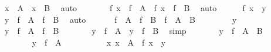\begin{isabellebody}
\begin{exercise}[subtitle=Svojstva funkcija]
\ {\isachardoublequoteopen}x\ {\isasymin}\ A\ {\isasymor}\ x\ {\isasymin}\ B{\isachardoublequoteclose}\ \isamarkupfalse%
\ auto\isanewline
\ \ \ \ \isamarkupfalse%
\ \isamarkupfalse%
\ {\isachardoublequoteopen}f\ x\ {\isasymin}\ f\ {\isacharbackquote}{\kern0pt}\ A\ {\isasymor}\ f\ x\ {\isasymin}\ f\ {\isacharbackquote}{\kern0pt}\ B{\isachardoublequoteclose}\ \isamarkupfalse%
\ auto\isanewline
\ \ \ \ \isamarkupfalse%
\ {\isacartoucheopen}f\ x\ {\isacharequal}{\kern0pt}\ y{\isacartoucheclose}\ \isamarkupfalse%
\ {\isachardoublequoteopen}y\ {\isasymin}\ f\ {\isacharbackquote}{\kern0pt}\ A\ {\isasymunion}\ f\ {\isacharbackquote}{\kern0pt}\ B{\isachardoublequoteclose}\ \isamarkupfalse%
\ auto\isanewline
\ \ \isamarkupfalse%
\isanewline
{}\isamarkupfalse%
\isanewline
\ \ \isamarkupfalse%
\ {\isachardoublequoteopen}f\ {\isacharbackquote}{\kern0pt}\ A\ {\isasymunion}\ f\ {\isacharbackquote}{\kern0pt}\ B\ {\isasymsubseteq}\ f\ {\isacharbackquote}{\kern0pt}\ {\isacharparenleft}{\kern0pt}A\ {\isasymunion}\ B{\isacharparenright}{\kern0pt}{\isachardoublequoteclose}\isanewline
\ \ \isamarkupfalse%
\isanewline
\ \ \ \ \isamarkupfalse%
\ y\isanewline
\ \ \ \ \isamarkupfalse%
\ {\isachardoublequoteopen}y\ {\isasymin}\ f\ {\isacharbackquote}{\kern0pt}\ A\ {\isasymunion}\ f\ {\isacharbackquote}{\kern0pt}\ B{\isachardoublequoteclose}\isanewline
\ \ \ \ \isamarkupfalse%
\ \isamarkupfalse%
\ {\isachardoublequoteopen}y\ {\isasymin}\ f\ {\isacharbackquote}{\kern0pt}\ A\ {\isasymor}\ y\ {\isasymin}\ f\ {\isacharbackquote}{\kern0pt}\ B{\isachardoublequoteclose}\ \isamarkupfalse%
\ simp\isanewline
\ \ \ \ \isamarkupfalse%
\ \isamarkupfalse%
\ {\isachardoublequoteopen}y\ {\isasymin}\ f\ {\isacharbackquote}{\kern0pt}\ {\isacharparenleft}{\kern0pt}A\ {\isasymunion}\ B{\isacharparenright}{\kern0pt}{\isachardoublequoteclose}\isanewline
\ \ \ \ \isamarkupfalse%
\isanewline
\ \ \ \ \ \ \isamarkupfalse%
\ {\isachardoublequoteopen}y\ {\isasymin}\ f\ {\isacharbackquote}{\kern0pt}\ A{\isachardoublequoteclose}\isanewline
\ \ \ \ \ \ \isamarkupfalse%
\ \isamarkupfalse%
\ {\isachardoublequoteopen}{\isasymexists}\ x{\isachardot}{\kern0pt}\ x\ {\isasymin}\ A\ {\isasymand}\ f\ x\ {\isacharequal}{\kern0pt}\ y{\isachardoublequoteclose}\ \isamarkupfalse%

\end{exercise}
\end{isabellebody}
